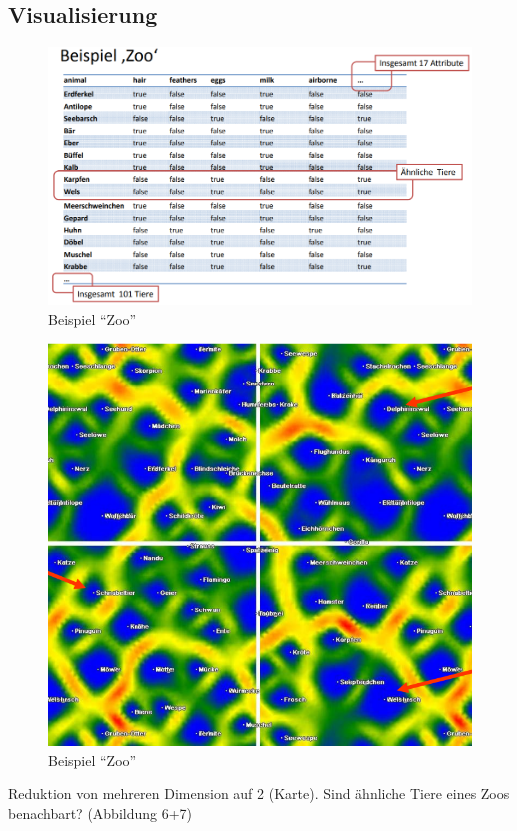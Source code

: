 \documentclass[11pt]{article}
\begin{document}
    \newpage

    \subsection{Visualisierung}
    \begin{figure}[ht!]
        \centering
        \includegraphics[width=15cm]{../../resources/zoo_table.png}
        \caption{Beispiel "`Zoo"'}
    \end{figure}

    \begin{figure}[ht!]
        \centering
        \includegraphics[width=12cm]{../../resources/zoo.png}
        \caption{Beispiel "`Zoo"'}
    \end{figure}
    Reduktion von mehreren Dimension auf 2 (Karte). Sind ähnliche Tiere eines Zoos benachbart?
    (Abbildung 6+7)
    \newpage
\end{document}
